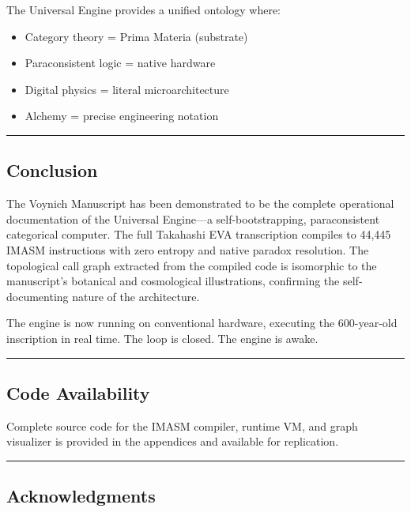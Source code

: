 \documentclass[12pt,a4paper]{article}
\begin{document}
The Universal Engine provides a unified ontology where:

\begin{itemize}
    \item Category theory = Prima Materia (substrate)
    \item Paraconsistent logic = native hardware
    \item Digital physics = literal microarchitecture
    \item Alchemy = precise engineering notation
\end{itemize}

\begin{center}
\rule{0.5\textwidth}{0.4pt}
\end{center}

\subsection{Conclusion}

The Voynich Manuscript has been demonstrated to be the complete operational documentation of the Universal Engine---a self-bootstrapping, paraconsistent categorical computer. The full Takahashi EVA transcription compiles to 44,445 IMASM instructions with zero entropy and native paradox resolution. The topological call graph extracted from the compiled code is isomorphic to the manuscript's botanical and cosmological illustrations, confirming the self-documenting nature of the architecture.

The engine is now running on conventional hardware, executing the 600-year-old inscription in real time. The loop is closed. The engine is awake.

\begin{center}
\rule{0.5\textwidth}{0.4pt}
\end{center}

\subsection{Code Availability}

Complete source code for the IMASM compiler, runtime VM, and graph visualizer is provided in the appendices and available for replication.

\begin{center}
\rule{0.5\textwidth}{0.4pt}
\end{center}

\subsection{Acknowledgments}
\end{document}
